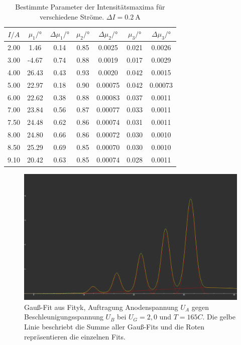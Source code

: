 \documentclass{article}
\begin{document}
\begin{table}[h]
  \centering
  \begin{tabular}{|ccccccc|}
    \toprule
    {$I/\si{A}$} & {$\mu_1/\si{\degree}$} & {$\Delta \mu_1/\si{\degree}$} & {$\mu_2/\si{\degree}$} & {$\Delta \mu_2/\si{\degree}$} & {$\mu_3/\si{\degree}$} & {$\Delta \mu_3/\si{\degree}$} \\
    \midrule
      2.00 & 1.46 & 0.14 & 0.85 & 0.0025 & 0.021 & 0.0026 \\
      3.00 & -4.67 & 0.74 & 0.88 & 0.0019 & 0.017 & 0.0029 \\
      4.00 & 26.43 & 0.43 & 0.93 & 0.0020 & 0.042 & 0.0015 \\
      5.00 & 22.97 & 0.18 & 0.90 & 0.00075 & 0.042 & 0.00073 \\
      6.00 & 22.62 & 0.38 & 0.88 & 0.00083 & 0.037 & 0.0011 \\
      7.00 & 23.84 & 0.56 & 0.87 & 0.00077 & 0.033 & 0.0011 \\
      7.50 & 24.48 & 0.62 & 0.86 & 0.00074 & 0.031 & 0.0011 \\
      8.00 & 24.80 & 0.66 & 0.86 & 0.00072 & 0.030 & 0.0010 \\
      8.50 & 25.29 & 0.69 & 0.85 & 0.00070 & 0.030 & 0.0010 \\
      9.10 & 20.42 & 0.63 & 0.85 & 0.00074 & 0.028 & 0.0011 \\
    \bottomrule
  \end{tabular}
  \caption{Bestimmte Parameter der Intensitätsmaxima für verschiedene Ströme. $\Delta I=\SI{0.2}{\A}$}
  \label{tab:parameter}
\end{table}
\clearpage
\begin{figure}[H]
  \centering
  \includegraphics[scale=0.2]{FH_2,7V_165C.png}
  \caption{Gauß-Fit aus Fityk, Auftragung Anodenspannung $U_A$ gegen Beschleunigungsspannung $U_B$ bei $U_G=2,0$ und $T=165C$. Die gelbe
  Linie beschriebt die Summe aller Gauß-Fits und die Roten repräsentieren die einzelnen Fits.}
  \label{FH 2,7V_165C}
\end{figure}
\end{document}
